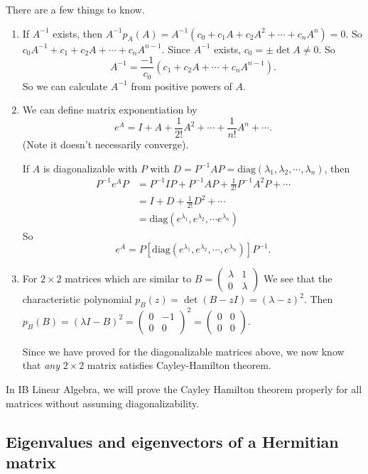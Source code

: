 \documentclass[a4paper]{article}
\begin{document}
There are a few things to know.
\begin{enumerate}
  \item If $A^{-1}$ exists, then $A^{-1} p_A(A) = A^{-1}(c_0 + c_1A + c_2A^2 + \cdots + c_n A^n) = 0$. So $c_0 A^{-1} + c_1 + c_2A + \cdots + c_n A^{n - 1}$. Since $A^{-1}$ exists, $c_0 = \pm \det A \not= 0$. So
    \[
      A^{-1} = \frac{-1}{c_0}(c_1 + c_2 A + \cdots + c_n A^{n -1}).
    \]
    So we can calculate $A^{-1}$ from positive powers of $A$.
  \item We can define matrix exponentiation by
    \[
      e^A = I + A + \frac{1}{2!}A^2 + \cdots + \frac{1}{n!}A^n + \cdots.
    \]
    (Note it doesn't necessarily converge).

    If $A$ is diagonalizable with $P$ with $D = P^{-1}AP = \mathrm{diag}(\lambda_1, \lambda_2, \cdots, \lambda_n)$, then
    \begin{align*}
      P^{-1}e^A P &= P^{-1}IP + P^{-1}AP + \frac{1}{2!}P^{-1}A^2P + \cdots\\
      &= I + D + \frac{1}{2!}D^{2} + \cdots\\
      &= \mathrm{diag}(e^{\lambda_1}, e^{\lambda_2}, \cdots e^{\lambda_n})
    \end{align*}
    So
    \[
      e^A = P[\mathrm{diag}(e^{\lambda_1}, e^{\lambda_2}, \cdots, e^{\lambda_n})]P^{-1}.
    \]
  \item For $2\times 2$ matrices which are similar to $B =
    \begin{pmatrix}
      \lambda & 1\\
      0 & \lambda
    \end{pmatrix}$
    We see that the characteristic polynomial $p_B(z) = \det (B - zI) = (\lambda - z)^2$. Then $p_B(B) = (\lambda I - B)^2 =
    \begin{pmatrix}
      0 & -1\\
      0 & 0
    \end{pmatrix}^2 =
    \begin{pmatrix}
      0 & 0\\
      0 & 0
    \end{pmatrix}$.

    Since we have proved for the diagonalizable matrices above, we now know that \emph{any} $2\times 2$ matrix satisfies Cayley-Hamilton theorem.
\end{enumerate}
In IB Linear Algebra, we will prove the Cayley Hamilton theorem properly for all matrices without assuming diagonalizability.

\subsection{Eigenvalues and eigenvectors of a Hermitian matrix}
\end{document}
